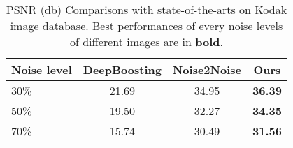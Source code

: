 \documentclass[journal]{IEEEtran}
\begin{document}
\begin{table}
\centering
\begin{tabular}{l|ccc}
\toprule
Noise level & DeepBoosting \cite{chen2018DeepBoosting} & Noise2Noise \cite{Lehtinen2018} & Ours \\
\midrule
30\% & 21.69 & 34.95 & \textbf{36.39} \\
50\% & 19.50 & 32.27 & \textbf{34.35} \\
70\% & 15.74 & 30.49 & \textbf{31.56} \\
\bottomrule
\end{tabular}
\caption{PSNR (db) Comparisons with state-of-the-arts on Kodak image database. Best performances of every noise levels of different images are in \textbf{bold}.}
\label{tab:pnsr_kodak}
\end{table}
\end{document}
